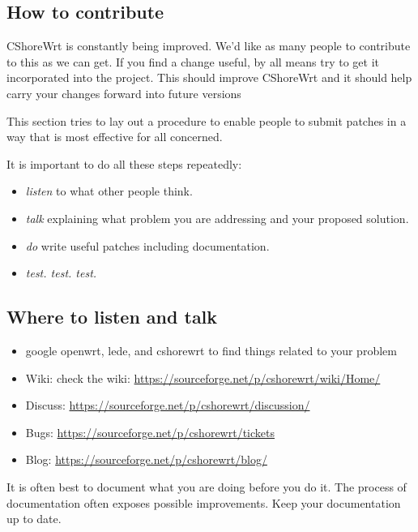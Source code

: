 \subsection{How to contribute}
CShoreWrt is constantly being improved.  We'd like as many people to contribute
to this as we can get. If you find a change useful, by all means try to get
it incorporated into the project. This should improve CShoreWrt and it should
help carry your changes forward into future versions

This section tries to lay out a procedure to enable people to submit patches
in a way that is most effective for all concerned.

It is important to do all these steps repeatedly:

\begin{itemize}
	\item \textit{listen} to what other people think.
	\item \textit{talk} explaining what problem you are addressing and your
		proposed solution.
	\item \textit{do} write useful patches including documentation.
    \item \textit{test. test. test.}
\end{itemize}

\subsection{Where to listen and talk}

\begin{itemize}
	\item google openwrt, lede, and cshorewrt to find things related to your problem
	\item Wiki: check the wiki: \href{http://sourceforge.net/p/cshorewrt/wiki/Home/}{https://sourceforge.net/p/cshorewrt/wiki/Home/}
	\item Discuss: \href{https://sourceforge.net/p/cshorewrt/discussion/}{https://sourceforge.net/p/cshorewrt/discussion/}
	\item Bugs: \href{https://sourceforge.net/p/cshorewrt/tickets/}{https://sourceforge.net/p/cshorewrt/tickets}
	\item Blog: \href{https://sourceforge.net/p/cshorewrt/blog/}{https://sourceforge.net/p/cshorewrt/blog/}
\end{itemize}

It is often best to document what you are doing before you do it.  The process
of documentation often exposes possible improvements.  Keep your documentation
up to date.
